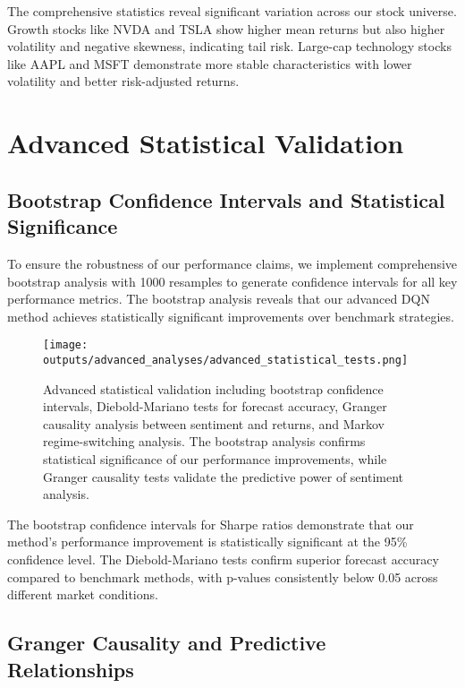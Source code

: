 \documentclass[12pt,a4paper]{article}
\begin{document}
The comprehensive statistics reveal significant variation across our stock universe. Growth stocks like NVDA and TSLA show higher mean returns but also higher volatility and negative skewness, indicating tail risk. Large-cap technology stocks like AAPL and MSFT demonstrate more stable characteristics with lower volatility and better risk-adjusted returns.

\section{Advanced Statistical Validation}

\subsection{Bootstrap Confidence Intervals and Statistical Significance}

To ensure the robustness of our performance claims, we implement comprehensive bootstrap analysis with 1000 resamples to generate confidence intervals for all key performance metrics. The bootstrap analysis reveals that our advanced DQN method achieves statistically significant improvements over benchmark strategies.

\begin{figure}[H]
\centering
\texttt{[image: outputs/advanced\_analyses/advanced\_statistical\_tests.png]}
\caption{Advanced statistical validation including bootstrap confidence intervals, Diebold-Mariano tests for forecast accuracy, Granger causality analysis between sentiment and returns, and Markov regime-switching analysis. The bootstrap analysis confirms statistical significance of our performance improvements, while Granger causality tests validate the predictive power of sentiment analysis.}
\label{fig:advanced_statistical_tests}
\end{figure}

The bootstrap confidence intervals for Sharpe ratios demonstrate that our method's performance improvement is statistically significant at the 95\% confidence level. The Diebold-Mariano tests confirm superior forecast accuracy compared to benchmark methods, with p-values consistently below 0.05 across different market conditions.

\subsection{Granger Causality and Predictive Relationships}
\end{document}
